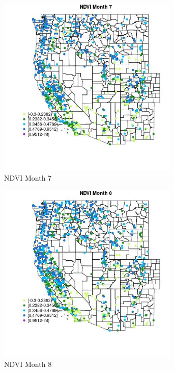 \begin{figure} 
\centering  
\includegraphics[width=0.77\textwidth]{Code_Outputs/Report_ML_input_PM25_Step4_part_f_de_duplicated_aves_prioritize_24hr_obswNAs_MapObsMo7NDVI.jpg} 
\caption{\label{fig:Report_ML_input_PM25_Step4_part_f_de_duplicated_aves_prioritize_24hr_obswNAsMapObsMo7NDVI}NDVI Month 7} 
\end{figure} 
 

\clearpage 

\begin{figure} 
\centering  
\includegraphics[width=0.77\textwidth]{Code_Outputs/Report_ML_input_PM25_Step4_part_f_de_duplicated_aves_prioritize_24hr_obswNAs_MapObsMo8NDVI.jpg} 
\caption{\label{fig:Report_ML_input_PM25_Step4_part_f_de_duplicated_aves_prioritize_24hr_obswNAsMapObsMo8NDVI}NDVI Month 8} 
\end{figure} 
 

